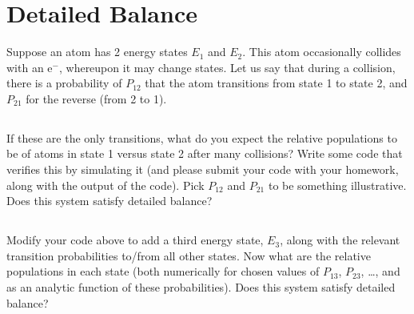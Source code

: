 \documentclass[11pt]{article}
\begin{document}
\section{Detailed Balance}

Suppose an atom has 2 energy states $E_1$ and $E_2$.  This atom occasionally
collides with an e$^-$, whereupon it may change states.  Let us say that
during a collision, there is a probability of $P_{12}$ that the atom transitions
from state 1 to state 2, and $P_{21}$ for the reverse (from 2 to 1).

\subsection{}
If these are the only transitions, what do you expect the relative populations
to be of atoms in state 1 versus state 2 after many collisions?  Write some
code that verifies this by simulating it (and please submit your code with your homework,
along with the output of the code).  Pick $P_{12}$ and $P_{21}$ to be something
illustrative.  Does this system satisfy detailed balance?

\subsection{}
Modify your code above to add a third energy state, $E_3$, along with the relevant
transition probabilities to/from all other states.  Now what are the relative
populations in each state (both numerically for chosen values of $P_{13}$, $P_{23}$, \dots,
and as an analytic function of these probabilities).  Does this system satisfy
detailed balance?
\end{document}
